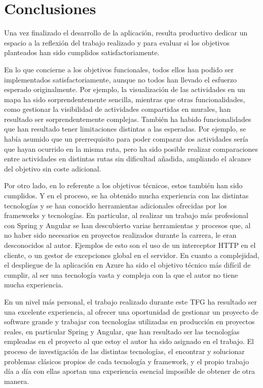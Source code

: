 \section{Conclusiones}
Una vez finalizado el desarrollo de la aplicación, resulta productivo dedicar un espacio a la reflexión del trabajo realizado y para evaluar si los objetivos planteados han sido cumplidos satisfactoriamente.

En lo que concierne a los objetivos funcionales, todos ellos han podido ser implementados satisfactoriamente, aunque no todos han llevado el esfuerzo esperado originalmente. Por ejemplo, la visualización de las actividades en un mapa ha sido sorprendentemente sencilla, mientras que otras funcionalidades, como gestionar la visibilidad de actividades compartidas en murales, han resultado ser sorprendentemente complejas. También ha habido funcionalidades que han resultado tener limitaciones distintas a las esperadas. Por ejemplo, se había asumido que un prerrequisito para poder comparar dos actividades sería que hayan ocurrido en la misma ruta, pero ha sido posible realizar comparaciones entre actividades en distintas rutas sin dificultad añadida, ampliando el alcance del objetivo sin coste adicional. 

Por otro lado, en lo referente a los objetivos técnicos, estos también han sido cumplidos. Y en el proceso, se ha obtenido mucha experiencia con las distintas tecnologías y se han conocido herramientas adicionales ofrecidas por los frameworks y tecnologías. En particular, al realizar un trabajo más profesional con Spring y Angular se han descubierto varias herramientas y procesos que, al no haber sido necesarios en proyectos realizados durante la carrera, le eran desconocidos al autor. Ejemplos de esto son el uso de un interceptor HTTP en el cliente, o un gestor de excepciones global en el servidor. En cuanto a complejidad, el despliegue de la aplicación en Azure ha sido el objetivo técnico más difícil de cumplir, al ser una tecnología vasta y compleja con la que el autor no tiene mucha experiencia.

En un nivel más personal, el trabajo realizado durante este TFG ha resultado ser una excelente experiencia, al ofrecer una oportunidad de gestionar un proyecto de software grande y trabajar con tecnologías utilizadas en producción en proyectos reales, en particular Spring y Angular, que han resultado ser las tecnologías empleadas en el proyecto al que estoy el autor ha sido asignado en el trabajo. El proceso de investigación de las distintas tecnologías, el encontrar y solucionar problemas clásicos propios de cada tecnología y framework, y el propio trabajo día a día con ellas aportan una experiencia esencial imposible de obtener de otra manera.

